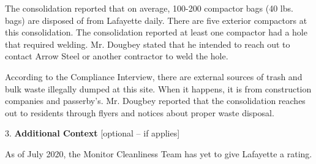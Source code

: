 The consolidation reported that on average, 100-200 compactor bags (40 lbs. bags) are disposed of from Lafayette daily. There are five exterior compactors at this consolidation. The consolidation reported at least one compactor had a hole that required welding. Mr. Dougbey stated that he intended to reach out to contact Arrow Steel or another contractor to weld the hole.

According to the Compliance Interview, there are external sources of trash and bulk waste illegally dumped at this site.  When it happens, it is from construction companies and passerby's. Mr. Dougbey reported that the consolidation reaches out to residents through flyers and notices about proper waste disposal.

3. \textbf{Additional Context} [optional -- if applies]

As of July 2020, the Monitor Cleanliness Team has yet to give Lafayette a rating.